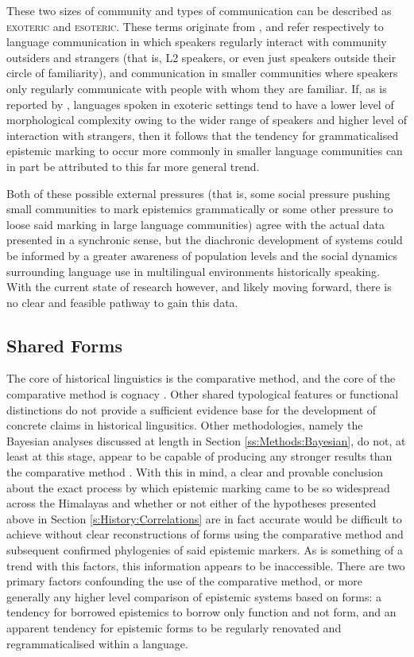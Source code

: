 These two sizes of community and types of communication can be described as \textsc{exoteric} and \textsc{esoteric}. These terms originate from , and refer respectively to language communication in which speakers regularly interact with community outsiders and strangers (that is, L2 speakers, or even just speakers outside their circle of familiarity), and communication in smaller communities where speakers only regularly communicate with people with whom they are familiar. If, as is reported by , languages spoken in exoteric settings tend to have a lower level of morphological complexity owing to the wider range of speakers and higher level of interaction with strangers, then it follows that the tendency for grammaticalised epistemic marking to occur more commonly in smaller language communities can in part be attributed to this far more general trend. 

Both of these possible external pressures (that is, some social pressure pushing small communities to mark epistemics grammatically or some other pressure to loose said marking in large language communities) agree with the actual data presented in a synchronic sense, but the diachronic development of systems could be informed by a greater awareness of population levels and the social dynamics surrounding language use in multilingual environments historically speaking. With the current state of research however, and likely moving forward, there is no clear and feasible pathway to gain this data.
\subsection{Shared Forms}\label{ss:History:SharedForms}
The core of historical linguistics is the comparative method, and the core of the comparative method is cognacy \cite{Hyslop2020Millet}. Other shared typological features or functional distinctions do not provide a sufficient evidence base for the development of concrete claims in historical lingusitics. Other methodologies, namely the Bayesian analyses discussed at length in Section \ref{ss:Methods:Bayesian}, do not, at least at this stage, appear to be capable of producing any stronger results than the comparative method \cite{Dolin2022}. With this in mind, a clear and provable conclusion about the exact process by which epistemic marking came to be so widespread across the Himalayas and whether or not either of the hypotheses presented above in Section \ref{s:History:Correlations} are in fact accurate would be difficult to achieve without clear reconstructions of forms using the comparative method and subsequent confirmed phylogenies of said epistemic markers. As is something of a trend with this factors, this information appears to be inaccessible. There are two primary factors confounding the use of the comparative method, or more generally any higher level comparison of epistemic systems based on forms: a tendency for borrowed epistemics to borrow only function and not form, and an apparent tendency for epistemic forms to be regularly renovated and regrammaticalised within a language. 

